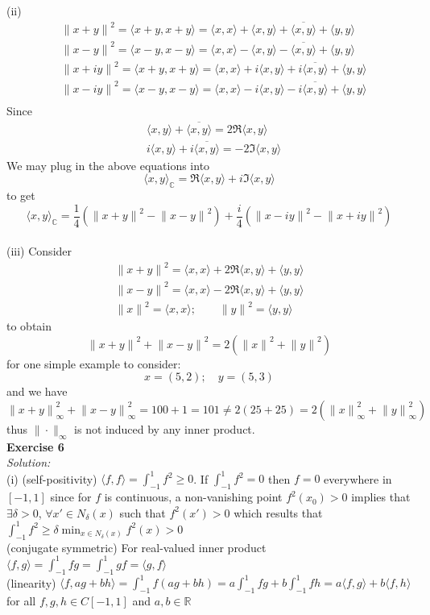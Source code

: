 \documentclass[12pt]{article}
\def\dotp#1#2{\langle#1,#2\rangle}
\def\es#1{{\bf Exercise #1}\\{\it Solution:}\\}
\begin{document}
(ii)\begin{align*}
&{\|x+y\|}^2=\dotp {x+y}{x+y}=\dotp{x}{x}+\dotp{x}{y}+\overline{\dotp{x}{y}}+\dotp{y}{y}\\
&{\|x-y\|}^2=\dotp {x-y}{x-y}=\dotp{x}{x}-\dotp{x}{y}-\overline{\dotp{x}{y}}+\dotp{y}{y}\\
&{\|x+iy\|}^2=\dotp {x+y}{x+y}=\dotp{x}{x}+i\dotp{x}{y}+i\overline{\dotp{x}{y}}+\dotp{y}{y}\\
&{\|x-iy\|}^2=\dotp {x-y}{x-y}=\dotp{x}{x}-i\dotp{x}{y}-i\overline{\dotp{x}{y}}+\dotp{y}{y}\\
\end{align*}
Since
\begin{align*}
&\dotp{x}{y}+\overline{\dotp{x}{y}}=2\Re\dotp{x}{y}\\
&i\dotp{x}{y}+i\overline{\dotp{x}{y}}=-2\Im\dotp{x}{y}
\end{align*}
We may plug in the above equations into
\[
\dotp{x}{y}_{\mathbb{C}}=\Re\dotp{x}{y}+i\Im\dotp{x}{y}
\]
to get
\[
\dotp{x}{y}_{\mathbb{C}}=\frac{1}{4}({\|x+y\|}^2-{\|x-y\|}^2)+\frac{i}{4}({\|x-iy\|}^2-{\|x+iy\|}^2)
\]\\[0.5 em]
(iii) Consider 
\begin{align*}
{\|x+y\|}^2=\dotp{x}{x}+2\Re\dotp{x}{y}+\dotp{y}{y}\\
{\|x-y\|}^2=\dotp{x}{x}-2\Re\dotp{x}{y}+\dotp{y}{y}\\
{\|x\|}^2=\dotp{x}{x};\qquad{\|y\|}^2=\dotp{y}{y}
\end{align*}
to obtain 
\[
{\|x+y\|}^2+{\|x-y\|}^2=2({\|x\|}^2+{\|y\|}^2)
\]
for one simple example to consider:
\[
x=(5,2);\quad y=(5,3)
\]
and we have 
\[
{\|x+y\|}_{\infty}^2+{\|x-y\|}_{\infty}^2=100+1=101\neq2(25+25)=2({\|x\|}_{\infty}^2+{\|y\|}_{\infty}^2)
\]
thus $\|\cdot\|_{\infty}$ is not induced by any inner product.\\[1 em]
\es6
(i)  (self-positivity) $\dotp{f}{f}=\int_{-1}^1f^2\ge0$. If $\int_{-1}^1f^2=0$ then $f=0$ everywhere in $[-1,1]$ since for $f$ is continuous, a non-vanishing point $f^2(x_0)>0$ implies that $\exists\delta>0$, $\forall x'\in N_{\delta}(x)$ such that $f^2(x')>0$ which results that $\int_{-1}^1f^2\ge\delta \min_{x\in N_{\delta}(x)}f^2(x)>0$\\
(conjugate symmetric) For real-valued inner product $\dotp{f}{g}=\int_{-1}^1fg=\int_{-1}^1gf=\dotp{g}{f}$\\
(linearity) $\dotp{f}{ag+bh}=\int_{-1}^1f(ag+bh)=a\int_{-1}^1fg+b\int_{-1}^1fh=a\dotp{f}{g}+b\dotp{f}{h}$ for all $f,g,h\in C[-1,1]$ and $a,b\in\mathbb{R}$\\[0.5 em]
\end{document}
